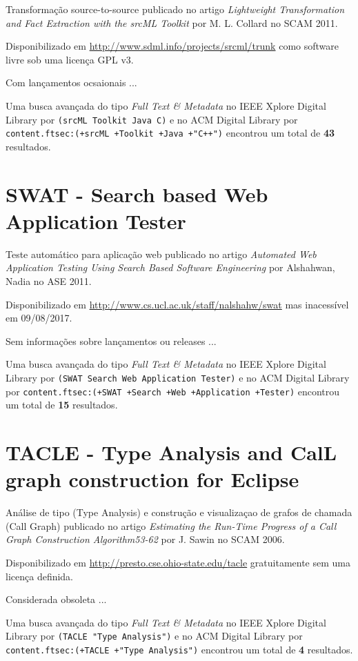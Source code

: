 Transformação source-to-source
publicado no artigo {\it Lightweight Transformation and Fact Extraction with the srcML Toolkit}
por M. L. Collard
no SCAM 2011.

Disponibilizado em \url{http://www.sdml.info/projects/srcml/trunk}
como software livre
sob uma licença GPL v3.

Com lançamentos ocsaionais ...


Uma busca avançada do tipo {\it Full Text \& Metadata} no IEEE Xplore Digital Library por
\texttt{(srcML Toolkit Java C)}
e no ACM Digital Library por
\texttt{content.ftsec:(+srcML +Toolkit +Java +"C++")}
encontrou um total de
{\bf 43}
resultados.

\section{SWAT - Search based Web Application Tester}

Teste automático para aplicação web
publicado no artigo {\it Automated Web Application Testing Using Search Based Software Engineering}
por Alshahwan, Nadia
no ASE 2011.

Disponibilizado em \url{http://www.cs.ucl.ac.uk/staff/nalshahw/swat}
mas inacessível em 09/08/2017.

Sem informações sobre lançamentos ou releases ...


Uma busca avançada do tipo {\it Full Text \& Metadata} no IEEE Xplore Digital Library por
\texttt{(SWAT Search Web Application Tester)}
e no ACM Digital Library por
\texttt{content.ftsec:(+SWAT +Search +Web +Application +Tester)}
encontrou um total de
{\bf 15}
resultados.

\section{TACLE - Type Analysis and CalL graph construction for Eclipse}

Análise de tipo (Type Analysis) e construção e visualizaçao de grafos de chamada (Call Graph)
publicado no artigo {\it Estimating the Run-Time Progress of a Call Graph Construction Algorithm53-62}
por J. Sawin
no SCAM 2006.

Disponibilizado em \url{http://presto.cse.ohio-state.edu/tacle}
gratuitamente
sem uma licença definida.

Considerada obsoleta ...


Uma busca avançada do tipo {\it Full Text \& Metadata} no IEEE Xplore Digital Library por
\texttt{(TACLE "Type Analysis")}
e no ACM Digital Library por
\texttt{content.ftsec:(+TACLE +"Type Analysis")}
encontrou um total de
{\bf 4}
resultados.


